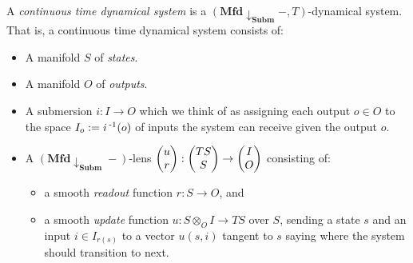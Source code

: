 \begin{defn}
A \emph{continuous time dynamical system} is a $(\textbf{Mfd}
\downarrow_{\textbf{Subm}} -, T)$-dynamical system. That is, a continuous time
dynamical system consists of:
\begin{itemize}
\item A manifold $S$ of \emph{states}.
\item A manifold $O$ of \emph{outputs}.
\item A submersion $i : I \to O$ which we think of as assigning each output $o \in
  O$ to the space $I_o := i\operatorname{^{-1}}(o)$ of inputs the system can receive given the
  output $o$.
\item A $(\textbf{Mfd}
\downarrow_{\textbf{Subm}} -)$-lens $\begin{pmatrix}{u} \\ {r} \end{pmatrix} : \begin{pmatrix}{TS} \\ {S} \end{pmatrix} \to \begin{pmatrix}{I} \\ {O} \end{pmatrix}$
consisting of:
\begin{itemize}
\item a smooth \emph{readout} function $r : S \to O$, and
  \item a smooth \emph{update} function $u : S \otimes_O I \to TS$ over $S$,
    sending a state $s$ and an input $i \in I_{r(s)}$ to a vector $u(s, i)$
    tangent to $s$ saying where the system should transition to next. 
\end{itemize}
\end{itemize}

\end{defn}














